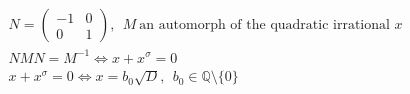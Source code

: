 \documentclass{article}
\begin{document}
\[
\begin{aligned}
&N=\begin{pmatrix}-1&0\\ 0&1\end{pmatrix},\ \ M\ \text{an automorph of the quadratic irrational }x\\
&NMN=M^{-1}\iff x+x^{\sigma}=0\\
&x+x^{\sigma}=0\iff x=b_0\sqrt{D},\ \ b_0\in\mathbb{Q}\setminus\{0\}
\end{aligned}
\]
\end{document}

